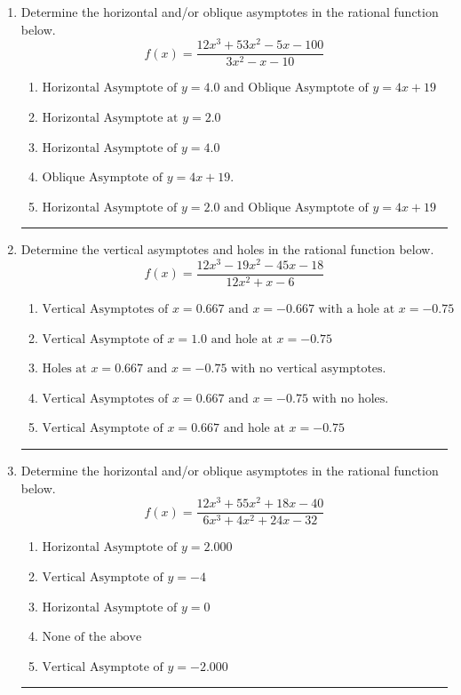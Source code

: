 \documentclass[14pt]{extbook}
\newcommand{\litem}[1]{\item#1\hspace*{-1cm}\rule{\textwidth}{0.4pt}}
\begin{document}
\begin{enumerate}
{\begin{enumerate}[label=\Alph*.]
\end{enumerate} }
\litem{
Determine the horizontal and/or oblique asymptotes in the rational function below.\[ f(x) = \frac{12x^{3} +53 x^{2} -5 x -100}{3x^{2} -x -10} \]\begin{enumerate}[label=\Alph*.]
\item \( \text{Horizontal Asymptote of } y = 4.0 \text{ and Oblique Asymptote of } y = 4x + 19 \)
\item \( \text{Horizontal Asymptote at } y = 2.0 \)
\item \( \text{Horizontal Asymptote of } y = 4.0  \)
\item \( \text{Oblique Asymptote of } y = 4x + 19. \)
\item \( \text{Horizontal Asymptote of } y = 2.0 \text{ and Oblique Asymptote of } y = 4x + 19 \)

\end{enumerate} }
\litem{
Determine the vertical asymptotes and holes in the rational function below.\[ f(x) = \frac{12x^{3} -19 x^{2} -45 x -18}{12x^{2} +x -6} \]\begin{enumerate}[label=\Alph*.]
\item \( \text{Vertical Asymptotes of } x = 0.667 \text{ and } x = -0.667 \text{ with a hole at } x = -0.75 \)
\item \( \text{Vertical Asymptote of } x = 1.0 \text{ and hole at } x = -0.75 \)
\item \( \text{Holes at } x = 0.667 \text{ and } x = -0.75 \text{ with no vertical asymptotes.} \)
\item \( \text{Vertical Asymptotes of } x = 0.667 \text{ and } x = -0.75 \text{ with no holes.} \)
\item \( \text{Vertical Asymptote of } x = 0.667 \text{ and hole at } x = -0.75 \)

\end{enumerate} }
\litem{
Determine the horizontal and/or oblique asymptotes in the rational function below.\[ f(x) = \frac{12x^{3} +55 x^{2} +18 x -40}{6x^{3} +4 x^{2} +24 x -32} \]\begin{enumerate}[label=\Alph*.]
\item \( \text{Horizontal Asymptote of } y = 2.000  \)
\item \( \text{Vertical Asymptote of } y = -4  \)
\item \( \text{Horizontal Asymptote of } y = 0  \)
\item \( \text{None of the above} \)
\item \( \text{Vertical Asymptote of } y = -2.000  \)


\end{enumerate}}
\end{enumerate}
\end{document}
